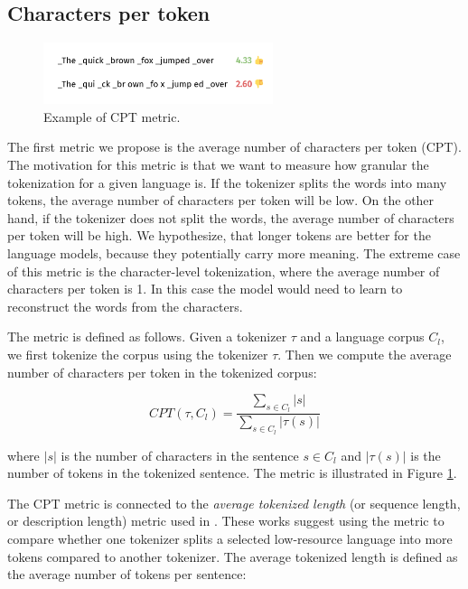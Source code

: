 
\subsection{Characters per token}

\begin{figure}[h]
    \centering
    \includegraphics[width=0.6\textwidth]{img/temp/cpt_example.png}
    \caption{Example of CPT metric.}
    \label{fig:cpt_example}
\end{figure}

The first metric we propose is the average number of characters per token (CPT). The motivation for this metric is that we want to measure how granular the tokenization for a given language is. If the tokenizer splits the words into many tokens, the average number of characters per token will be low. On the other hand, if the tokenizer does not split the words, the average number of characters per token will be high. We hypothesize, that longer tokens are better for the language models, because they potentially carry more meaning. The extreme case of this metric is the character-level tokenization, where the average number of characters per token is 1. In this case the model would need to learn to reconstruct the words from the characters.

The metric is defined as follows. Given a tokenizer $\tau$ and a language corpus $C_l$, we first tokenize the corpus using the tokenizer $\tau$. Then we compute the average number of characters per token in the tokenized corpus:

\begin{equation}
    CPT(\tau, C_l) = \frac{\sum_{s \in C_l}|s|}{\sum_{s \in C_l}|\tau(s)|}
\end{equation}

where $|s|$ is the number of characters in the sentence $s \in C_l$ and $|\tau(s)|$ is the number of tokens in the tokenized sentence. The metric is illustrated in Figure \ref{fig:cpt_example}.

The CPT metric is connected to the \textit{average tokenized length} (or sequence length, or description length) metric used in \citet{chung_improving_2020,liang_xlm-v_2023}. 
These works suggest using the metric to compare whether one tokenizer splits a selected low-resource language into more tokens compared to another tokenizer. The average tokenized length is defined as the average number of tokens per sentence: 

